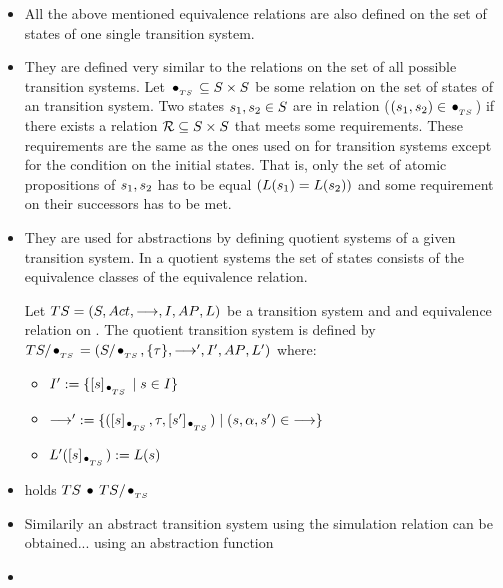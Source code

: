 \documentclass[preview]{standalone}
\begin{document}
\begin{itemize}
			\item All the above mentioned equivalence relations are also defined on the set of states of one single transition system. 
			\item They are defined very similar to the relations on the set of all possible transition systems. Let ${\;\!\bullet_{_{\tiny{TS}}}\;\!} \subseteq {S} \times {S}$ be some relation on the set of states \states of an transition system. Two states ${s}_1,{s}_2 \in {S}$ are in relation ($({s}_1, {s}_2) \in {\;\!\bullet_{_{\tiny{TS}}}\;\!}$) if there exists a relation ${\mathcal{R}} \subseteq {S} \times {S}$ that meets some requirements. These requirements are the same as the ones used on \mimicrel for transition systems except for the condition on the initial states. That is, only the set of atomic propositions of ${s}_1, {s}_2$ has to be equal $({L}({s}_1) = {L}({s}_2))$ and some requirement on their successors has to be met.
			\item They are used for abstractions by defining quotient systems of a given transition system. In a quotient systems the set of states consists of the equivalence classes of the equivalence relation.
			\begin{definition}
				Let ${TS} = {({S}, {Act}, {\longrightarrow}, {I}, {AP}, {L})}$ be a transition system and \relts and equivalence relation on \states. The quotient transition system is defined by $TS/{\;\!\bullet_{_{\tiny{TS}}}\;\!} = ({S}/{\;\!\bullet_{_{\tiny{TS}}}\;\!}, \{\tau\}, {\longrightarrow}', {I}', {AP}, {L}')$ where:
				\begin{itemize}
					\item ${I}' := \{{[{s}]_{{\;\!\bullet_{_{\tiny{TS}}}\;\!}}} \mid {s} \in {I}\}$
					\item ${\longrightarrow}':= \{({[{s}]_{{\;\!\bullet_{_{\tiny{TS}}}\;\!}}}, \tau, {[{s}']_{{\;\!\bullet_{_{\tiny{TS}}}\;\!}}}) \mid ({s}, {\alpha}, {s}') \in {\longrightarrow}\}$
					\item ${L}'({[{s}]_{{\;\!\bullet_{_{\tiny{TS}}}\;\!}}}) := {L}({s})$
				\end{itemize}
			\end{definition}
			
			
			
			
			\item holds ${TS} \; {\;\!\bullet\;\!} \; {TS}/{\;\!\bullet_{_{\tiny{TS}}}\;\!}$
			
			\item Similarily an abstract transition system using the simulation relation can be obtained... using an abstraction function
			
			\item {}
			

\end{itemize}
\end{document}
